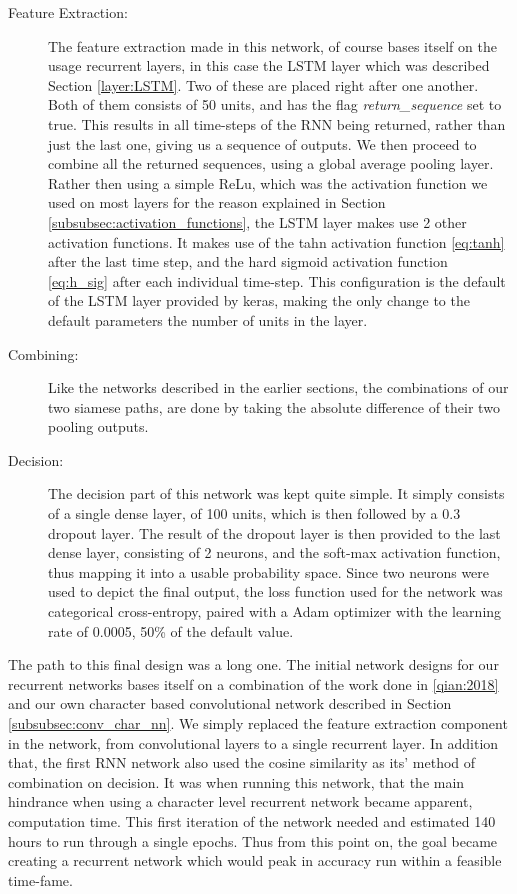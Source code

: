 \begin{description}
\item[Feature Extraction:] The feature extraction made in this network, of
course bases itself on the usage recurrent layers, in this case the \gls{LSTM}
layer which was described Section \ref{layer:LSTM}. Two of these are placed
right after one another. Both of them consists of 50 units, and has the flag
\textit{return\_sequence} set to true. This results in all time-steps of
the \gls{RNN} being returned, rather than just the last one, giving us a
sequence of outputs. We then proceed to combine all the returned sequences,
using a global average pooling layer. Rather then using a simple ReLu, which
was the activation function we used on most layers for the reason explained
in Section \ref{subsubsec:activation_functions}, the LSTM layer makes use
2 other activation functions. It makes use of the tahn activation function
\eqref{eq:tanh} after the last time step, and the hard sigmoid activation
function \eqref{eq:h_sig} after each individual time-step. This configuration
is the default of the LSTM layer provided by keras, making the only change to
the default parameters the number of units in the layer.

\item[Combining:] Like the networks described in the earlier sections,
the combinations of our two siamese paths, are done by taking the absolute difference
of their two pooling outputs.

\item[Decision:] The decision part of this network was kept quite simple. It
simply consists of a single dense layer, of 100 units, which is then followed
by a 0.3 dropout layer. The result of the dropout layer is then provided to the
last dense layer, consisting of 2 neurons, and the soft-max activation function,
thus mapping it into a usable probability space. Since two neurons were used to
depict the final output, the loss function used for the network was categorical
cross-entropy, paired with a \gls{Adam} optimizer with the learning rate
of 0.0005, 50\% of the default value.

\end{description}

The path to this final design was a long one. The initial network designs
for our recurrent networks bases itself on a combination of the work done in
\ref{qian:2018} and our own character based convolutional network described in
Section \ref{subsubsec:conv_char_nn}. We simply replaced the feature extraction
component in the network, from convolutional layers to a single recurrent layer.
In addition that, the first \gls{RNN} network also used the cosine similarity
as its' method of combination on decision. It was when running this network,
that the main hindrance when using a character level recurrent network became
apparent, computation time. This first iteration of the network needed and
estimated 140 hours to run through a single epochs. Thus from this point on, the
goal became creating a recurrent network which would peak in accuracy run within
a feasible time-fame.

